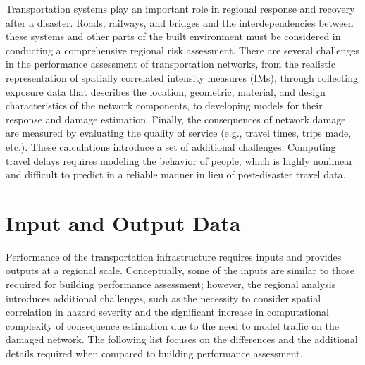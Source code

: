 Transportation systems play an important role in regional response and recovery after a disaster. Roads, railways, and bridges and the interdependencies between these systems and other parts of the built environment must be considered in conducting a comprehensive regional risk assessment. There are several challenges in the performance assessment of transportation networks, from the realistic representation of spatially correlated intensity measures (IMs), through collecting exposure data that describes the location, geometric, material, and design characteristics of the network components, to developing models for their response and damage estimation. Finally, the consequences of network damage are measured by evaluating the quality of service (e.g., travel times, trips made, etc.). These calculations introduce a set of additional challenges. Computing travel delays requires modeling the behavior of people, which is highly nonlinear and difficult to predict in a reliable manner in lieu of post-disaster travel data.
 
\section{Input and Output Data}
\label{sec:perf_transport_io}

Performance of the transportation infrastructure requires inputs and provides outputs at a regional scale. Conceptually, some of the inputs are similar to those required for building performance assessment; however, the regional analysis introduces additional challenges, such as the necessity to consider spatial correlation in hazard severity and the significant increase in computational complexity of consequence estimation due to the need to model traffic on the damaged network. The following list focuses on the differences and the additional details required when compared to building performance assessment.

